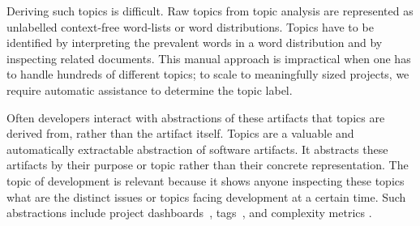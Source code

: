 \documentclass[]{sig-alternate}
\begin{document}



Deriving such topics is difficult. 
Raw topics from topic analysis are represented as unlabelled context-free word-lists or word distributions.
Topics have to be identified by interpreting the prevalent words in a word distribution and by inspecting related documents. 
This manual approach is impractical when one has to handle hundreds of different topics; to scale to meaningfully sized projects, we require automatic assistance to determine the topic label.

Often developers interact with abstractions of these artifacts that topics are derived from, rather than the artifact itself. 
Topics are a valuable and automatically extractable abstraction of software artifacts.
It abstracts these artifacts by their purpose or topic rather than their concrete representation.
The topic of development is relevant because it shows anyone inspecting these topics what are the distinct issues or topics facing development at a certain time.
Such abstractions include project dashboards~\cite{kersten2005mylar}, tags~\cite{treude2010}, and complexity metrics \cite{mccabe1976complexity}. 
\end{document}
